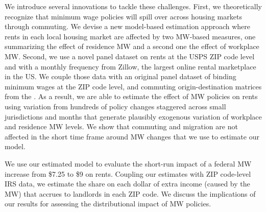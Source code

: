 
We introduce several innovations to tackle these challenges.
First, we theoretically recognize that minimum wage policies will spill over 
across housing markets through commuting.
We devise a new model-based estimation approach where rents in each local 
housing market are affected by two MW-based measures, one summarizing the 
effect of residence MW and a second one the effect of workplace MW.
Second, we use a novel panel dataset on rents at the USPS ZIP code level and with 
a monthly frequency from Zillow, the largest online rental marketplace in the US.
We couple those data with an original panel dataset of binding minimum wages 
at the ZIP code level, and commuting origin-destination matrices from 
the \textcite{CensusLODES}.
As a result, we are able to estimate the effect of MW policies on rents using 
variation from hundreds of policy changes staggered across small jurisdictions 
and months that generate plausibly exogenous variation of workplace and 
residence MW levels.
We show that commuting and migration are not affected in the short time frame 
around MW changes that we use to estimate our model.

We use our estimated model to evaluate the short-run impact of a federal MW 
increase from \$7.25 to \$9 on rents.
Coupling our estimates with ZIP code-level IRS data, we estimate the share on 
each dollar of extra income (caused by the MW) that accrues to landlords in each 
ZIP code.
We discuss the implications of our results for assessing the distributional 
impact of MW policies.


